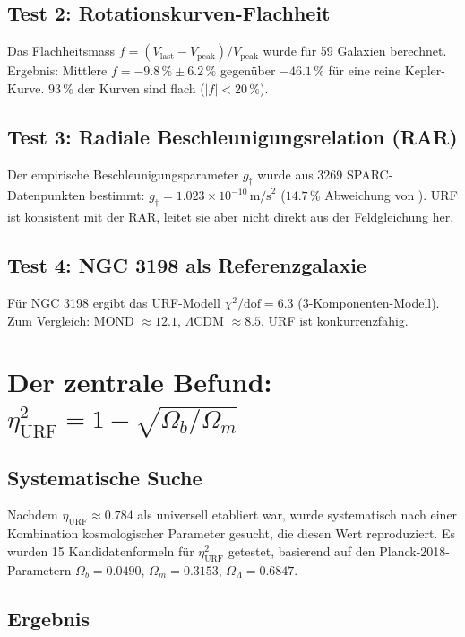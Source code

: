 \documentclass[12pt,a4paper]{article}
\theoremstyle{definition}
\begin{document}
\subsection{Test 2: Rotationskurven-Flachheit}

Das Flachheitsmass $f = (V_{\mathrm{last}} - V_{\mathrm{peak}})/V_{\mathrm{peak}}$
wurde für 59 Galaxien berechnet. Ergebnis: Mittlere
$f = -9.8\,\% \pm 6.2\,\%$ gegenüber $-46.1\,\%$ für eine reine
Kepler-Kurve. $93\,\%$ der Kurven sind flach ($|f| < 20\,\%$).

\subsection{Test 3: Radiale Beschleunigungsrelation (RAR)}

Der empirische Beschleunigungsparameter $g_\dagger$ wurde aus 3269
SPARC-Datenpunkten bestimmt:
$g_\dagger = 1.023 \times 10^{-10}\,\mathrm{m/s}^2$
($14.7\,\%$ Abweichung von \cite{McGaugh2016}). URF ist konsistent
mit der RAR, leitet sie aber nicht direkt aus der Feldgleichung her.

\subsection{Test 4: NGC 3198 als Referenzgalaxie}

Für NGC 3198 ergibt das URF-Modell $\chi^2/\mathrm{dof} = 6.3$
(3-Komponenten-Modell). Zum Vergleich: MOND $\approx 12.1$,
$\Lambda$CDM $\approx 8.5$. URF ist konkurrenzfähig.

\section{Der zentrale Befund: $\eta_{\mathrm{URF}}^2 = 1 - \sqrt{\Omega_b/\Omega_m}$}
\label{sec:eta}

\subsection{Systematische Suche}

Nachdem $\eta_{\mathrm{URF}} \approx 0.784$ als universell etabliert war, wurde
systematisch nach einer Kombination kosmologischer Parameter gesucht,
die diesen Wert reproduziert. Es wurden 15 Kandidatenformeln für $\eta_{\mathrm{URF}}^2$
getestet, basierend auf den Planck-2018-Parametern
$\Omega_b = 0.0490$, $\Omega_m = 0.3153$, $\Omega_\Lambda = 0.6847$.

\subsection{Ergebnis}
\end{document}

